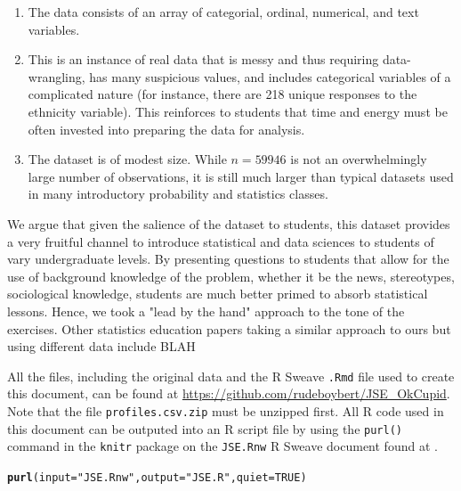\documentclass{article}\usepackage[]{graphicx}\usepackage[]{color}
\makeatletter
\newcommand{\hlnum}[1]{\textcolor[rgb]{0.686,0.059,0.569}{#1}}%
\newcommand{\hlstr}[1]{\textcolor[rgb]{0.192,0.494,0.8}{#1}}%
\newcommand{\hlstd}[1]{\textcolor[rgb]{0.345,0.345,0.345}{#1}}%
\newcommand{\hlkwc}[1]{\textcolor[rgb]{0.333,0.667,0.333}{#1}}%
\newcommand{\hlkwd}[1]{\textcolor[rgb]{0.737,0.353,0.396}{\textbf{#1}}}%
\newenvironment{kframe}{%
 \def\at@end@of@kframe{}%
 \ifinner\ifhmode%
  \def\at@end@of@kframe{\end{minipage}}%
  \begin{minipage}{\columnwidth}%
 \fi\fi%
 \def\FrameCommand##1{\hskip\@totalleftmargin \hskip-\fboxsep
 \colorbox{shadecolor}{##1}\hskip-\fboxsep
     \hskip-\linewidth \hskip-\@totalleftmargin \hskip\columnwidth}%
 \MakeFramed {\advance\hsize-\width
   \@totalleftmargin\z@ \linewidth\hsize
   \@setminipage}}%
 {\par\unskip\endMakeFramed%
 \at@end@of@kframe}
\newenvironment{knitrout}{}{} %
\makeatother
\begin{document}
\begin{enumerate}
\item The data consists of an array of categorial, ordinal, numerical, and text variables.
\item This is an instance of real data that is messy and thus requiring data-wrangling, has many suspicious values, and includes categorical variables of a complicated nature (for instance, there are 218 unique responses to the ethnicity variable).  This reinforces to students that time and energy must be often invested into preparing the data for analysis.
\item The dataset is of modest size.  While $n = 59946$ is not an overwhelmingly large number of observations, it is still much larger than typical datasets used in many introductory probability and statistics classes.
\end{enumerate}

We argue that given the salience of the dataset to students, this dataset provides a very fruitful channel to introduce statistical and data sciences to students of vary undergraduate levels.  By presenting questions to students that allow for the use of background knowledge of the problem, whether it be the news, stereotypes, sociological knowledge, students are much better primed to absorb statistical lessons.  Hence, we took a "lead by the hand" approach to the tone of the exercises.  Other statistics education papers taking a similar approach to ours but using different data include BLAH

All the files, including the original data and the R Sweave \verb#.Rmd# file used to create this document, can be found at \url{https://github.com/rudeboybert/JSE_OkCupid}.  Note that the file \verb#profiles.csv.zip# must be unzipped first.  All R code used in this document can be outputed into an R script file by using the \verb#purl()# command in the \verb#knitr# package on the \verb#JSE.Rnw# R Sweave document found at .
\begin{knitrout}
\color{fgcolor}\begin{kframe}
\begin{alltt}
\hlkwd{purl}\hlstd{(}\hlkwc{input}\hlstd{=}\hlstr{"JSE.Rnw"}\hlstd{,} \hlkwc{output}\hlstd{=}\hlstr{"JSE.R"}\hlstd{,} \hlkwc{quiet}\hlstd{=}\hlnum{TRUE}\hlstd{)}
\end{alltt}
\end{kframe}
\end{knitrout}
\end{document}
